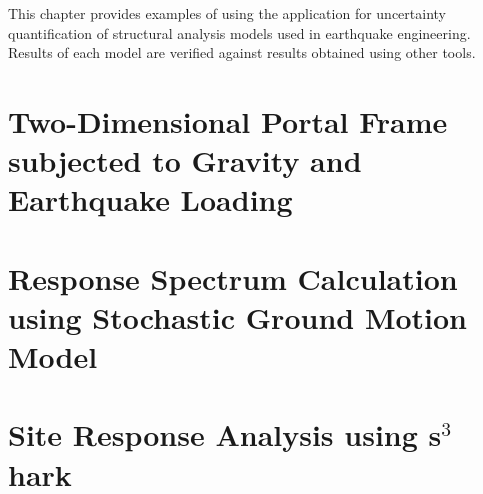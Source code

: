 This chapter provides examples of using the \texttt{\getsoftwarename{}} application for uncertainty
quantification of structural analysis models used in earthquake
engineering. Results of each model are verified against results
obtained using other tools.\\

\section{Two-Dimensional Portal Frame subjected to Gravity and Earthquake Loading}


\section{Response Spectrum Calculation using Stochastic Ground Motion Model}


\section{Site Response Analysis using s$^3$hark}

